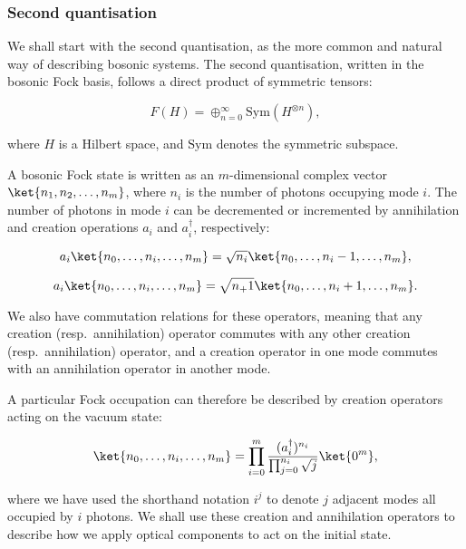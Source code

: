 \subsubsection{Second quantisation}

We shall start with the second quantisation, as the more common and natural way of describing bosonic systems. The second quantisation, written in the bosonic Fock basis, follows a direct product of symmetric tensors:

\begin{equation}
F(H) = \oplus_{n=0}^\infty\textrm{Sym}(H^{\otimes n}),
\end{equation}

\noindent where $H$ is a Hilbert space, and $\textrm{Sym}$ denotes the symmetric subspace.

A bosonic Fock state is written as an $m$-dimensional complex vector $\ket{n_1,n_2,\dots,n_m}$, where $n_i$ is the number of photons occupying mode $i$. The number of photons in mode $i$ can be decremented or incremented by annihilation and creation operations $a_i$ and $a_i^\dagger$, respectively:

\begin{equation}
a_i\ket{n_0,\dots,n_i,\dots,n_m} = \sqrt{n_i}\ket{n_0,\dots,n_i-1,\dots,n_m},
\end{equation}

\begin{equation}
a_i\ket{n_0,\dots,n_i,\dots,n_m} = \sqrt{n_+1}\ket{n_0,\dots,n_i+1,\dots,n_m}.
\end{equation}

We also have commutation relations for these operators, meaning that any creation (resp.\ annihilation) operator commutes with any other creation (resp.\ annihilation) operator, and a creation operator in one mode commutes with an annihilation operator in another mode.

A particular Fock occupation can therefore be described by creation operators acting on the vacuum state:

\begin{equation}
\ket{n_0,\dots,n_i,\dots,n_m} = \prod_{i=0}^m\frac{(a_i^\dagger)^{n_i}}{\prod_{j=0}^{n_i}\sqrt{j}}\ket{0^m},
\end{equation}

\noindent where we have used the shorthand notation $i^j$ to denote $j$ adjacent modes all occupied by $i$ photons. We shall use these creation and annihilation operators to describe how we apply optical components to act on the initial state.

